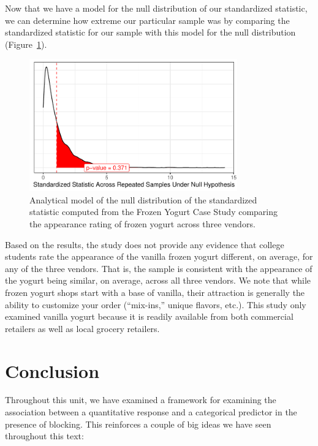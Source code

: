 \documentclass[
  letterpaper,
  DIV=11,
  numbers=noendperiod]{scrreprt}
\theoremstyle{plain}
\theoremstyle{definition}
\theoremstyle{definition}
\theoremstyle{remark}
\begin{document}
Now that we have a model for the null distribution of our standardized
statistic, we can determine how extreme our particular sample was by
comparing the standardized statistic for our sample with this model for
the null distribution (Figure~\ref{fig-blockrecap-null-distribution}).

\begin{figure}

{\centering \includegraphics[width=0.8\textwidth,height=\textheight]{./images/fig-blockrecap-null-distribution-1.pdf}

}

\caption{\label{fig-blockrecap-null-distribution}Analytical model of the
null distribution of the standardized statistic computed from the Frozen
Yogurt Case Study comparing the appearance rating of frozen yogurt
across three vendors.}

\end{figure}

Based on the results, the study does not provide any evidence that
college students rate the appearance of the vanilla frozen yogurt
different, on average, for any of the three vendors. That is, the sample
is consistent with the appearance of the yogurt being similar, on
average, across all three vendors. We note that while frozen yogurt
shops start with a base of vanilla, their attraction is generally the
ability to customize your order (``mix-ins,'' unique flavors, etc.).
This study only examined vanilla yogurt because it is readily available
from both commercial retailers as well as local grocery retailers.

\hypertarget{conclusion-1}{%
\section{Conclusion}\label{conclusion-1}}

Throughout this unit, we have examined a framework for examining the
association between a quantitative response and a categorical predictor
in the presence of blocking. This reinforces a couple of big ideas we
have seen throughout this text:
\end{document}
